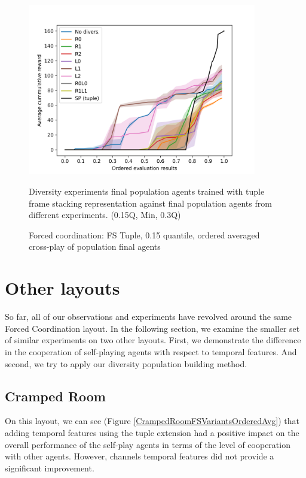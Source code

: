 \begin{figure}[!ht]
    \centering
    \includegraphics*[width=10cm]{../img/FinalPopFinalPopFsTupleQ15.png}

    \caption{Forced coordination: FS Tuple, 0.15 quantile, ordered averaged cross-play of population final agents}
    \label{FinalPopFinalPopFsTupleQ15}
    \medskip
    \small 
    Diversity experiments final population agents trained with tuple frame stacking representation against final population agents from different experiments.
    (0.15Q, Min, 0.3Q)


\end{figure}

\newpage

\section{Other layouts}
So far, all of our observations and experiments have revolved around the same Forced Coordination layout.
In the following section, we examine the smaller set of similar experiments on two other layouts.
First, we demonstrate the difference in the cooperation of self-playing agents with respect to temporal features.
And second, we try to apply our diversity population building method.



\subsection{Cramped Room}
On this layout, we can see (Figure \ref{CrampedRoomFSVariantsOrderedAvg}) that adding temporal features using the tuple extension had a positive impact on the overall performance of the self-play agents in terms of the level of cooperation with other agents.
However, channels temporal features did not provide a significant improvement.

